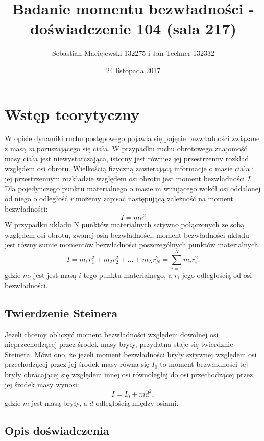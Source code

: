 \documentclass[10pt,a4paper]{article}
\author{Sebastian Maciejewski 132275 i Jan Techner 132332}
\title{Badanie momentu bezwładności - \\ doświadczenie 104 (sala 217)}
\date{24 listopada 2017}
\newcommand{\forceindent}{\leavevmode{\parindent=3em\indent}}
\begin{document}
\maketitle
\section{Wstęp teorytyczny}
\forceindent W opisie dynamiki ruchu postępowego pojawia się pojęcie bezwładności związane z masą \textit{m} poruszającego się ciała. W przypadku ruchu obrotowego znajomość masy ciała jest niewystarczająca, istotny
jest również jej przestrzenny rozkład względem osi obrotu. Wielkością fizyczną zawierającą informacje o
masie ciała i jej przestrzennym rozkładzie względem osi obrotu jest moment bezwładności \textit{I}.\\
\forceindent Dla pojedynczego punktu materialnego o masie m wirującego wokół osi oddalonej od niego o
odległość \textit{r} możemy zapisać następującą zależność na moment bezwładności:
\begin{equation}
I=mr^2
\end{equation}
W przypadku układu N punktów materialnych sztywno połączonych ze sobą względem osi obrotu, zwanej osią bezwładności, moment bezwładności układu jest równy sumie momentów bezwładności poszczególnych punktów materialnych.
\begin{equation}
I=m_1r_{1}^{2} + m_2r_{2}^{2} + ... + m_Nr_{N}^{2} = \sum\limits_{i=1}^{N} m_{i}r_{i}^{2}.
\end{equation}
gdzie $m_{i}$ jest jest masą $i$-tego punktu materialnego, a $r_{i}$ jego odległością od osi bezwładności.
\subsection*{Twierdzenie Steinera} 
\forceindent Jeżeli chcemy obliczyć moment bezwładności względem dowolnej osi nieprzechodzącej przez środek masy bryły, przydatna staje się twierdznie Steinera. Mówi ono, że jeżeli moment bezwładności bryły sztywnej względem osi przechodzącej przez jej środek masy równa się $I_{0}$ to moment bezwładności tej bryły obracającej się względem innej osi równoległej do osi przechodzącej przez jej środek masy wynosi:
\begin{equation}
I = I_{0} + md^2,
\end{equation}
gdzie $m$ jest masą bryły, a $d$ odległością między osiami.

\subsection*{Opis doświadczenia}
\end{document}
